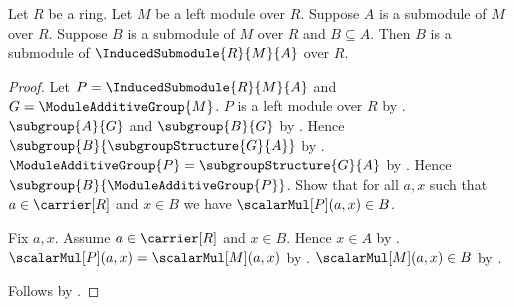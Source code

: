 \begin{theorem}\label{submodule_of_induced_submodule}
    Let $R$ be a ring.
    Let $M$ be a left module over $R$.
    Suppose $A$ is a submodule of $M$ over $R$.
    Suppose $B$ is a submodule of $M$ over $R$ and $B\subseteq A$.
    Then $B$ is a submodule of $\InducedSubmodule{R}{M}{A}$ over $R$.
\end{theorem}
\begin{proof}
    Let $P=\InducedSubmodule{R}{M}{A}$ and
        $G=\ModuleAdditiveGroup{M}$.
    $P$ is a left module over $R$ by
        .
    $\subgroup{A}{G}$ and $\subgroup{B}{G}$ by
        .
    Hence $\subgroup{B}{\subgroupStructure{G}{A}}$ by
        .
    $\ModuleAdditiveGroup{P}=\subgroupStructure{G}{A}$ by
        .
    Hence $\subgroup{B}{\ModuleAdditiveGroup{P}}$.
    Show that for all $a,x$ such that $a\in\carrier[R]$ and $x\in B$
        we have $\scalarMul[P](a,x)\in B$.
    \begin{subproof}
        Fix $a,x$.
        Assume $a\in\carrier[R]$ and $x\in B$.
        Hence $x\in A$ by .
        $\scalarMul[P](a,x)=\scalarMul[M](a,x)$ by
            .
        $\scalarMul[M](a,x)\in B$ by .
    \end{subproof}
    Follows by .
\end{proof}

